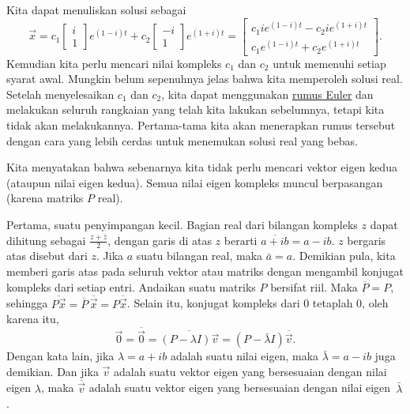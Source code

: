 Kita dapat menuliskan solusi sebagai
\begin{equation*}
\vec{x} =
c_1 \begin{bmatrix} i \\ 1 \end{bmatrix} e^{(1-i)t} +
c_2 \begin{bmatrix} -i \\ 1 \end{bmatrix} e^{(1+i)t}
=
\begin{bmatrix}
c_1 i e^{(1-i)t} - c_2 i e^{(1+i)t} \\
c_1 e^{(1-i)t} + c_2 e^{(1+i)t}
\end{bmatrix} .
\end{equation*}
Kemudian kita perlu mencari nilai kompleks $c_1$ dan $c_2$ untuk memenuhi
setiap syarat awal.  Mungkin belum sepenuhnya jelas
bahwa kita memperoleh solusi real.  Setelah menyelesaikan $c_1$ dan $c_2$,
kita dapat menggunakan
\hyperref[eulersformula]{rumus Euler} dan melakukan seluruh rangkaian
yang telah kita lakukan sebelumnya, tetapi kita tidak akan melakukannya.  Pertama-tama kita akan menerapkan
rumus tersebut dengan cara yang lebih cerdas untuk menemukan solusi real yang bebas.

\medskip

Kita menyatakan bahwa sebenarnya kita tidak perlu mencari vektor eigen kedua
(ataupun nilai eigen kedua).  Semua nilai eigen kompleks muncul berpasangan
(karena matriks $P$ real).

Pertama, suatu penyimpangan kecil.  Bagian real dari
bilangan kompleks $z$ dapat dihitung sebagai $\frac{z + \bar{z}}{2}$, dengan
garis di atas $z$ berarti $\overline{a+ib} = a -ib$.  $z$ bergaris atas disebut
\emph{} dari $z$.
Jika $a$ suatu bilangan real, maka $\bar{a} = a$.
Demikian pula,
kita memberi garis atas pada seluruh vektor atau matriks dengan mengambil konjugat kompleks
dari setiap entri.  Andaikan suatu matriks $P$ bersifat riil.  Maka
$\overline{P} = P$, sehingga $\overline{P\vec{x}} = \overline{P} \,
\overline{\vec{x}} = P \overline{\vec{x}}$.
Selain itu, konjugat kompleks dari 0 tetaplah 0,
oleh karena itu,
\begin{equation*}
\vec{0} = \overline{\vec{0}} = 
\overline{(P-\lambda I)\vec{v}}
=
(P-\bar{\lambda} I)\overline{\vec{v}} .
\end{equation*}
Dengan kata lain, jika $\lambda = a+ib$ adalah suatu nilai eigen, maka $\bar{\lambda} = a-ib$ juga demikian.
Dan jika $\vec{v}$ adalah suatu vektor eigen yang bersesuaian dengan nilai eigen
$\lambda$, maka $\overline{\vec{v}}$ adalah suatu vektor eigen yang bersesuaian
dengan nilai eigen~$\bar{\lambda}$.  

